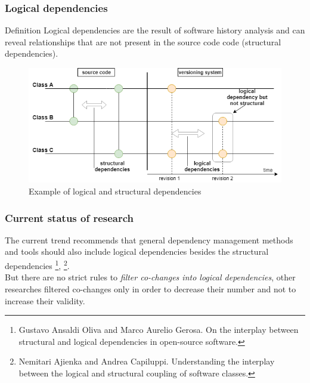 \documentclass{beamer}
\begin{document}
 \begin{frame}
\frametitle{Logical dependencies}
\begin{block}{Definition}
 Logical dependencies are the result of software history analysis and can reveal relationships that are not present in the source code code (structural dependencies).
\end{block}

\begin{center}
     \begin{figure}
	\includegraphics[width=\textwidth]{fig1.png}
	\caption{\label{fig:fig1}Example of logical and structural dependencies}
     \end{figure}
\end{center}

\end{frame}


 \begin{frame}
\frametitle{Current status of research}
The current trend recommends that general dependency management methods and tools should also include logical dependencies besides the structural dependencies \footnote{Gustavo Ansaldi Oliva and Marco Aurelio Gerosa. On the interplay between
structural and logical dependencies in open-source software.}, \footnote{Nemitari Ajienka and Andrea Capiluppi. Understanding the interplay between the logical and structural coupling of software classes.}. \\
But there are no strict rules to \textit{filter co-changes into logical dependencies}, other researches filtered co-changes only in order to decrease their number and not to increase their validity.

\end{frame}

\end{document}
